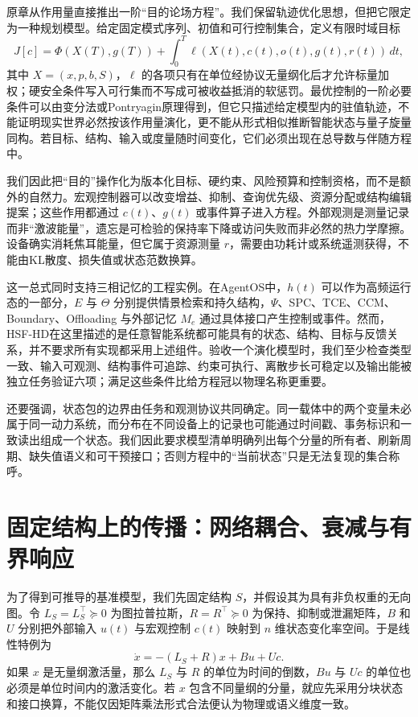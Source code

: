 原章从作用量直接推出一阶“目的论场方程”。我们保留轨迹优化思想，但把它限定为一种规划模型。给定固定模式序列、初值和可行控制集合，定义有限时域目标
\begin{equation}
 J[c]=\Phi(X(T),g(T))+
 \int_0^T \ell(X(t),c(t),o(t),g(t),r(t))\,dt,
\end{equation}
其中 $X=(x,p,b,S)$，$\ell$ 的各项只有在单位经协议无量纲化后才允许标量加权；硬安全条件写入可行集而不写成可被收益抵消的软惩罚。最优控制的一阶必要条件可以由变分法或Pontryagin原理得到，但它只描述给定模型内的驻值轨迹，不能证明现实世界必然按该作用量演化，更不能从形式相似推断智能状态与量子旋量同构。若目标、结构、输入或度量随时间变化，它们必须出现在总导数与伴随方程中。

我们因此把“目的”操作化为版本化目标、硬约束、风险预算和控制资格，而不是额外的自然力。宏观控制器可以改变增益、抑制、查询优先级、资源分配或结构编辑提案；这些作用都通过 $c(t)$、$g(t)$ 或事件算子进入方程。外部观测是测量记录而非“激波能量”，遗忘是可检验的保持率下降或访问失败而非必然的热力学摩擦。设备确实消耗焦耳能量，但它属于资源测量 $r$，需要由功耗计或系统遥测获得，不能由KL散度、损失值或状态范数换算。

这一总式同时支持三相记忆的工程实例。在AgentOS中，$h(t)$ 可以作为高频运行态的一部分，$E$ 与 $\Theta$ 分别提供情景检索和持久结构，$\Psi$、SPC、TCE、CCM、Boundary、Offloading 与外部记忆 $M_e$ 通过具体接口产生控制或事件。然而，HSF-HD在这里描述的是任意智能系统都可能具有的状态、结构、目标与反馈关系，并不要求所有实现都采用上述组件。验收一个演化模型时，我们至少检查类型一致、输入可观测、结构事件可追踪、约束可执行、离散步长可稳定以及输出能被独立任务验证六项；满足这些条件比给方程冠以物理名称更重要。

还要强调，状态包的边界由任务和观测协议共同确定。同一载体中的两个变量未必属于同一动力系统，而分布在不同设备上的记录也可能通过时间戳、事务标识和一致读出组成一个状态。我们因此要求模型清单明确列出每个分量的所有者、刷新周期、缺失值语义和可干预接口；否则方程中的“当前状态”只是无法复现的集合称呼。

\section{固定结构上的传播：网络耦合、衰减与有界响应}
\label{sec:section_954}

为了得到可推导的基准模型，我们先固定结构 $S$，并假设其为具有非负权重的无向图。令 $L_S=L_S^\top\succeq0$ 为图拉普拉斯，$R=R^\top\succeq0$ 为保持、抑制或泄漏矩阵，$B$ 和 $U$ 分别把外部输入 $u(t)$ 与宏观控制 $c(t)$ 映射到 $n$ 维状态变化率空间。于是线性特例为
\begin{equation}
 \dot x=-(L_S+R)x+Bu+Uc.
 \label{eq:hsf_linear_state}
\end{equation}
如果 $x$ 是无量纲激活量，那么 $L_S$ 与 $R$ 的单位为时间的倒数，$Bu$ 与 $Uc$ 的单位也必须是单位时间内的激活变化。若 $x$ 包含不同量纲的分量，就应先采用分块状态和接口换算，不能仅因矩阵乘法形式合法便认为物理或语义维度一致。

